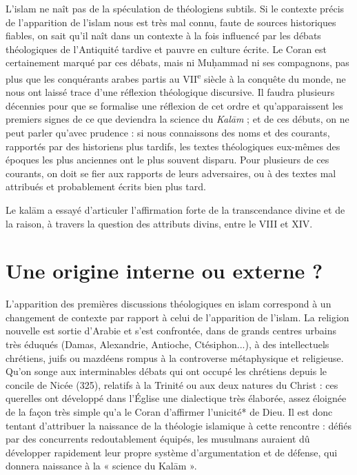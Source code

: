 L'islam ne naît pas de la spéculation de théologiens subtils. Si le
contexte précis de l'apparition de l'islam nous est très mal connu,
faute de sources historiques fiables, on sait qu'il naît dans un
contexte à la fois influencé par les débats théologiques de l'Antiquité
tardive et pauvre en culture écrite. Le Coran est certainement marqué
par ces débats, mais ni Muḥammad ni ses compagnons, pas plus que les
conquérants arabes partis au VII\textsuperscript{e} siècle à la conquête
du monde, ne nous ont laissé trace d'une réflexion théologique
discursive. Il faudra plusieurs décennies pour que se formalise une
réflexion de cet ordre et qu'apparaissent les premiers signes de ce que
deviendra la science du \emph{Kalām} ; et de ces débuts, on ne peut
parler qu'avec prudence : si nous connaissons des noms et des courants,
rapportés par des historiens plus tardifs, les textes théologiques
eux-mêmes des époques les plus anciennes ont le plus souvent disparu.
Pour plusieurs de ces courants, on doit se fier aux rapports de leurs
adversaires, ou à des textes mal attribués et probablement écrits bien
plus tard.
\begin{Synthesis}
Le kalām a essayé d'articuler l'affirmation forte de la transcendance divine et de la raison, à travers la question des attributs divins, entre le VIII et XIV.
\end{Synthesis}

\hypertarget{une-origine-interne-ou-externe}{%
\section{Une origine interne ou externe
?}\label{une-origine-interne-ou-externe}}

L'apparition des premières discussions théologiques en islam correspond
à un changement de contexte par rapport à celui de l'apparition de
l'islam. La religion nouvelle est sortie d'Arabie et s'est confrontée,
dans de grands centres urbains très éduqués (Damas, Alexandrie,
Antioche, Ctésiphon...), à des intellectuels chrétiens, juifs ou
mazdéens rompus à la controverse métaphysique et religieuse. Qu'on songe
aux interminables débats qui ont occupé les chrétiens depuis le concile
de Nicée (325), relatifs à la Trinité ou aux deux natures du Christ :
ces querelles ont développé dans l'Église une dialectique très élaborée,
assez
éloignée de la façon très simple qu'a le Coran d'affirmer
l'unicité* de Dieu. Il est donc tentant d'attribuer la
naissance de la théologie islamique à cette rencontre : défiés par des
concurrents redoutablement équipés, les musulmans auraient dû développer
rapidement leur propre système d'argumentation et de défense, qui
donnera naissance à la « science du Kalām ».

